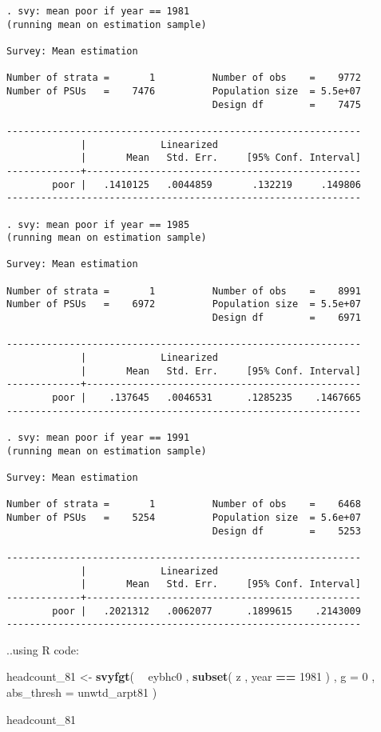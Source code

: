 \documentclass[]{book}
\newenvironment{Shaded}{\begin{snugshade}}{\end{snugshade}}
\newcommand{\DataTypeTok}[1]{\textcolor[rgb]{0.13,0.29,0.53}{#1}}
\newcommand{\DecValTok}[1]{\textcolor[rgb]{0.00,0.00,0.81}{#1}}
\newcommand{\KeywordTok}[1]{\textcolor[rgb]{0.13,0.29,0.53}{\textbf{#1}}}
\newcommand{\NormalTok}[1]{#1}
\newcommand{\OperatorTok}[1]{\textcolor[rgb]{0.81,0.36,0.00}{\textbf{#1}}}
\newcommand{\StringTok}[1]{\textcolor[rgb]{0.31,0.60,0.02}{#1}}
\begin{document}
\begin{verbatim}
. svy: mean poor if year == 1981
(running mean on estimation sample)

Survey: Mean estimation

Number of strata =       1          Number of obs    =    9772
Number of PSUs   =    7476          Population size  = 5.5e+07
                                    Design df        =    7475

--------------------------------------------------------------
             |             Linearized
             |       Mean   Std. Err.     [95% Conf. Interval]
-------------+------------------------------------------------
        poor |   .1410125   .0044859       .132219     .149806
--------------------------------------------------------------

. svy: mean poor if year == 1985
(running mean on estimation sample)

Survey: Mean estimation

Number of strata =       1          Number of obs    =    8991
Number of PSUs   =    6972          Population size  = 5.5e+07
                                    Design df        =    6971

--------------------------------------------------------------
             |             Linearized
             |       Mean   Std. Err.     [95% Conf. Interval]
-------------+------------------------------------------------
        poor |    .137645   .0046531      .1285235    .1467665
--------------------------------------------------------------

. svy: mean poor if year == 1991
(running mean on estimation sample)

Survey: Mean estimation

Number of strata =       1          Number of obs    =    6468
Number of PSUs   =    5254          Population size  = 5.6e+07
                                    Design df        =    5253

--------------------------------------------------------------
             |             Linearized
             |       Mean   Std. Err.     [95% Conf. Interval]
-------------+------------------------------------------------
        poor |   .2021312   .0062077      .1899615    .2143009
--------------------------------------------------------------
\end{verbatim}

..using R code:

\begin{Shaded}
\begin{Highlighting}[]
\NormalTok{headcount_}\DecValTok{81}\NormalTok{ <-}\StringTok{ }
\StringTok{    }\KeywordTok{svyfgt}\NormalTok{( }
        \OperatorTok{~}\StringTok{ }\NormalTok{eybhc0 , }
        \KeywordTok{subset}\NormalTok{( z , year }\OperatorTok{==}\StringTok{ }\DecValTok{1981}\NormalTok{ ) , }
        \DataTypeTok{g =} \DecValTok{0}\NormalTok{ , }
        \DataTypeTok{abs_thresh =}\NormalTok{ unwtd_arpt81}
\NormalTok{    )}

\NormalTok{headcount_}\DecValTok{81}
\end{Highlighting}
\end{Shaded}
\end{document}
